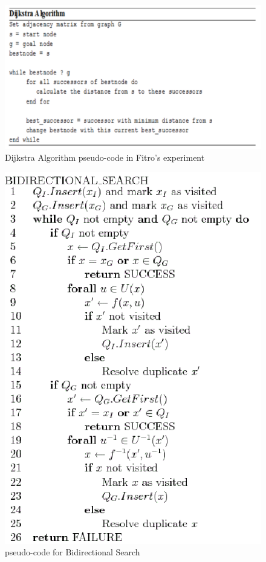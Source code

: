 \documentclass[12pt]{article}
\begin{document}
\begin{figure}[H]
\centering
\includegraphics[scale=0.37]{images/Dijkstra(GIS).png}
\caption{Dijkstra Algorithm pseudo-code in Fitro’s experiment \cite{Fitro_2018}}
\label{fig: dijkstra}
\end{figure}

\begin{figure}[H]
\centering
\includegraphics[scale=0.7]{images/BS.png}
\caption{pseudo-code for Bidirectional Search}
\label{fig: bidirectional}
\end{figure}
\end{document}
